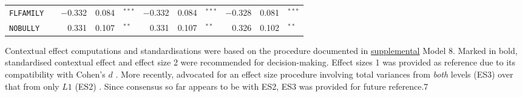 {\begin{tabular}{l c rr@{\hskip -0.1mm}l rr@{\hskip -0.1mm}l rr@{\hskip -0.1mm}l}
        \texttt{FLFAMILY} &       & $-$0.332 & 0.084 & $^{***}$   & $-$0.332 & 0.084 & $^{***}$   & $-$0.328 & 0.081 & $^{***}$ \\
        \texttt{NOBULLY} &       & 0.331 & 0.107 & $^{**}$    & 0.331 & 0.107 & $^{**}$    & 0.326 & 0.102 & $^{**}$ \\
        \bottomrule
        \end{tabular}
}{Contextual effect computations and standardisations were based on the procedure documented in  \href{https://www.statmodel.com/download/Marsh Ludtke et al 2009 Doubly-latent Models of BFLPE  MBR full appendix .pdf}{supplemental} Model 8. Marked in bold, standardised contextual effect and effect size 2 were recommended for decision-making. Effect sizes 1 \parencite{tymms:2004} was provided as reference due to its compatibility with Cohen's $d$ \parencite{cohen:1992}. More recently, \textcite{marsh:2009} advocated for an effect size procedure involving total variances from \emph{both} levels (ES3) over that from only $L1$ (ES2) \parencite[see][p. 792]{marsh:2009}. Since consensus so far appears to be with ES2, ES3 was provided for future reference.}{7}
